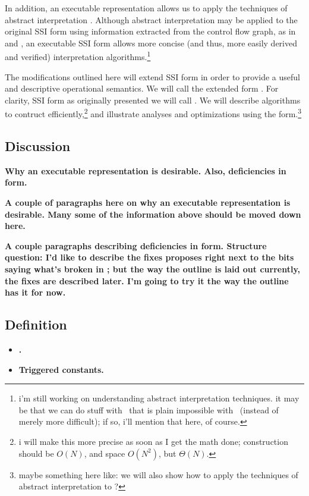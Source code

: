 \documentclass[12pt,notitlepage,twoside]{article}
\begin{document}
In addition, an executable representation allows us to apply the
techniques of abstract interpretation \cite{idunno}.  Although abstract
interpretation may be applied to the original SSI form using
information extracted from the control flow graph, as in \cite{foo}
and \cite{bar}, an executable SSI form allows more concise (and thus,
more easily derived and verified) interpretation
algorithms.\footnote{i'm still working on understanding abstract
interpretation techniques.  it may be that we can do stuff with
\ssiplus\ that is plain impossible with \ssizero\ (instead of merely
more difficult); if so, i'll mention that here, of course.}

The modifications outlined here will extend SSI form in order to
provide a useful and descriptive operational semantics.  We will call
the extended form \ssiplus.  For clarity, SSI form as originally
presented we will call \ssizero.  We will describe algorithms to
contruct \ssiplus{} efficiently,\footnote{i will make this more precise
as soon as I get the math done; construction should be $O(N)$, and space
$O(N^2)$, but $\Theta(N)$.} and illustrate analyses and
optimizations using the form.\footnote{maybe something here like: we
will also show how to apply the techniques of abstract interpretation
to \ssiplus?}

\subsection{Discussion}
\textbf{Why an executable representation is desirable.  Also,
deficiencies in \ssizero{} form.}

\textbf{A couple of paragraphs here on why an executable
representation is desirable.  Many some of the information above
should be moved down here.}

\textbf{A couple paragraphs describing deficiencies in \ssizero{} form.
Structure question: I'd like to describe the fixes \ssiplus{} proposes
right next to the bits saying what's broken in \ssizero{}; but the way
the outline is laid out currently, the fixes are described later.  I'm
going to try it the way the outline has it for now.}

\subsection{Definition}
\begin{itemize}
\item \textbf{.}
\item \textbf{Triggered constants.}
\end{itemize}
\end{document}
